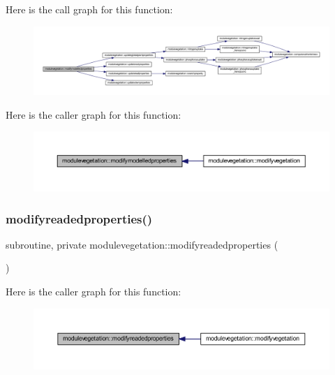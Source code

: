 Here is the call graph for this function\+:\nopagebreak
\begin{figure}[H]
\begin{center}
\leavevmode
\includegraphics[width=350pt]{namespacemodulevegetation_a5532e866feccedcf7ef4094cb3f08064_cgraph}
\end{center}
\end{figure}
Here is the caller graph for this function\+:\nopagebreak
\begin{figure}[H]
\begin{center}
\leavevmode
\includegraphics[width=350pt]{namespacemodulevegetation_a5532e866feccedcf7ef4094cb3f08064_icgraph}
\end{center}
\end{figure}
\mbox{\label{namespacemodulevegetation_a510092ab1c09ecfe1b683080ec88826a}} 
\subsubsection{\texorpdfstring{modifyreadedproperties()}{modifyreadedproperties()}}
{\footnotesize\ttfamily subroutine, private modulevegetation\+::modifyreadedproperties (\begin{DoxyParamCaption}{ }\end{DoxyParamCaption})\hspace{0.3cm}{\ttfamily [private]}}

Here is the caller graph for this function\+:\nopagebreak
\begin{figure}[H]
\begin{center}
\leavevmode
\includegraphics[width=350pt]{namespacemodulevegetation_a510092ab1c09ecfe1b683080ec88826a_icgraph}
\end{center}
\end{figure}
\mbox{\label{namespacemodulevegetation_ada29538c07fc35e07aff7961509fee8d}} 
